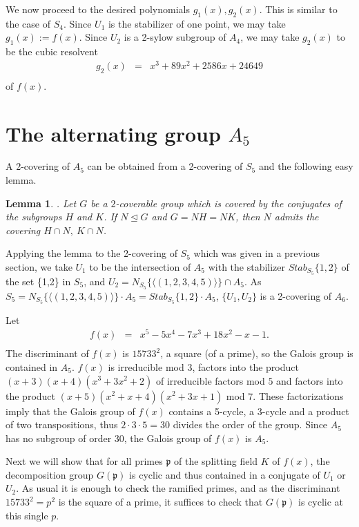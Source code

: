 \documentclass[reqno,12pt]{amsart}
\newtheorem{lemma}[theorem]{Lemma}
\theoremstyle{remark}
\theoremstyle{definition}
\theoremstyle{citing}
\numberwithin{theorem}{section}
\numberwithin{equation}{section}
\begin{document}
We now proceed to the desired polynomials $g_1(x),g_2(x)$.  This is similar to the case of $S_4$.
Since $U_{1}$ is the stabilizer of one point, we may take $g_1(x):=f(x)$.
Since $U_{2}$ is a 2-sylow subgroup of $A_4$, we may take $g_{2}(x)$ to be
the cubic resolvent \begin{eqnarray*}
g_{2}(x) & = & x^{3}+89x^{2}+2586x+24649\\
\end{eqnarray*} of $f(x)$.

\section{The alternating group $A_{5}$}

A 2-covering of $A_{5}$ can be obtained from a 2-covering
of $S_{5}$ and the following easy lemma.

\begin{lemma} \cite{Bubboloni}. Let $G$ be a $2$-coverable group which is covered by
the conjugates of the subgroups $H$ and $K$. If $N\trianglelefteq G$ and $G=NH=NK$, then
$N$ admits the covering $H\cap N,\ K\cap N$.
\end{lemma}

Applying the lemma to the 2-covering of $S_{5}$ which was given in
a previous section, we take $U_{1}$ to be the intersection of
$A_{5}$ with the stabilizer $Stab_{S_{5}}\{1,2\}$  of the set \{1,2\} in $S_{5}$,
and $U_{2}=N_{S_{5}}\{\langle(1,2,3,4,5)\rangle\}\cap A_{5}$.
As $S_{5}=N_{S_{5}}\{\langle(1,2,3,4,5)\rangle\}\cdot A_{5}=Stab_{S_{5}}\{1,2\}\cdot A_{5}$,
$\{U_1,U_2\}$ is a 2-covering of $A_{6}$.

 Let \begin{eqnarray*}
f(x) & = & x^{5}-5x^{4}-7x^{3}+18x^{2}-x-1.\\
\end{eqnarray*}
The discriminant of
$f(x)$ is $15733^{2}$,  a square (of a prime), so the Galois group is contained in $A_{5}$.
 $f(x)$ is irreducible mod $3$, factors into the product
$(x+3)(x+4)(x^{3}+3x^{2}+2)$ of irreducible factors mod $5$ and
factors into the product $(x+5)(x^{2}+x+4)(x^{2}+3x+1)$ mod $7$.
These factorizations imply that the Galois group of $f(x)$ contains
a 5-cycle, a 3-cycle and a product of two transpositions, thus $2\cdot3\cdot5=30$
divides the order of the group. Since $A_{5}$ has no subgroup
of order 30, the Galois group of $f(x)$ is $A_{5}$.

Next we will show that for all primes $\mathfrak{p}$ of the splitting field $K$ of $f(x)$, the
decomposition group $G(\mathfrak{p})$ is cyclic and thus contained
in a conjugate of $U_{1}$ or $U_{2}$.  As usual it is enough to check the ramified
primes, and as the discriminant $15733^{2}=p^{2}$
 is the square of a prime, it suffices to check that $G(\mathfrak{p})$ is cyclic at this single $p$.
\end{document}
